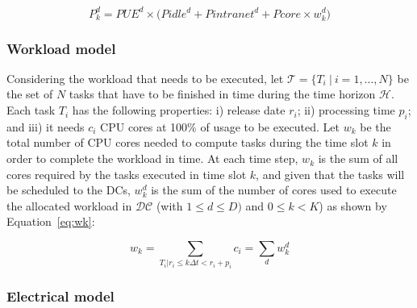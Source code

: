 \begin{equation} \label{eq:power_cons}
   P^d_k  = PUE^d \times \big( Pidle^d + Pintranet^d + Pcore \times w^d_k\big)
\end{equation}



\subsubsection{Workload model}
\label{sec:workload_model_ccgrid}
Considering the workload that needs to be executed, let $\mathcal{T} = \{T_i \ | \ i=1, \ldots, N\}$ be the set of $N$ tasks that have to be finished in time during the time horizon $\mathcal{H}$. Each task $T_i$ has the following properties: i) release date $r_i$; ii)  processing time $p_i$;  and iii) it needs $c_i$ CPU cores at 100\% of usage to be executed. Let $w_k$ be the total number of CPU cores needed to compute tasks during the time slot $k$ in order to complete the workload in time. At each time step, $w_k$ is the sum of all cores required by the tasks executed in time slot $k$, and given that the tasks will be scheduled to the DCs,  $w_k^d$ is the sum of the number of cores used to execute the allocated workload in $\mathcal{DC}$ (with $1\leq d\leq D)$ and $0\leq k<K$) as shown by Equation~\eqref{eq:wk}:

\begin{equation} \label{eq:wk}
    w_k = \sum_{T_i|r_i\leq k\Delta t<r_i+p_i} c_i = \sum_d w_k^d
\end{equation}


\subsubsection{Electrical model}
\label{sec:electrical_model_ccgrid}


